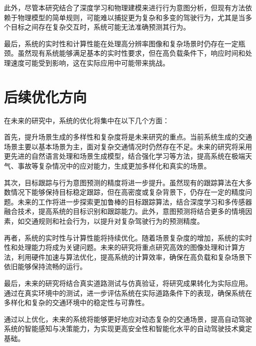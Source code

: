 此外，尽管本研究结合了深度学习和物理建模来进行行为意图分析，但现有方法依赖于物理模型的简单规则，可能难以捕捉更为复杂和多变的驾驶行为，尤其是当多个目标之间存在复杂交互时，系统可能无法准确预测其行为。

最后，系统的实时性和计算性能在处理高分辨率图像和复杂场景时仍存在一定瓶颈。虽然现有系统能够满足基本的实时性要求，但在高负载条件下，响应时间和处理速度可能受到影响，这在实际应用中可能带来挑战。

\section{后续优化方向}

在未来的研究中，系统的优化将集中在以下几个方面：

首先，提升场景生成的多样性和复杂度将是未来研究的重点。当前系统生成的交通场景主要以基本场景为主，面对复杂交通情况时仍然存在不足。未来的研究将采用更先进的自然语言处理和场景生成模型，结合强化学习等方法，提高系统在极端天气、事故等复杂情况中的应对能力，生成更加多样化和真实的场景。

其次，目标跟踪与行为意图预测的精度将进一步提升。虽然现有的跟踪算法在大多数情况下能够保持目标稳定跟踪，但在高密度或复杂背景下，仍存在一定的精度问题。未来的工作将进一步探索更加鲁棒的目标跟踪算法，结合深度学习和多传感器融合技术，提高系统的目标识别和跟踪能力。此外，意图预测将结合更多的情境因素，如交通规则和社会行为，以提升对复杂驾驶行为的预测精度。

再者，系统的实时性与计算性能将持续优化。随着场景复杂度的增加，系统的实时性和处理能力将成为关键问题。未来的研究将重点研究高效的图像处理和计算方法，利用硬件加速与算法优化，提高系统的计算效率，确保在高负载和复杂场景下依旧能够保持流畅的运行。

最后，未来的研究将结合真实道路测试与仿真验证，将研究成果转化为实际应用。通过在真实环境中的测试，进一步评估系统在实际道路条件下的表现，确保系统在多样化和复杂的交通环境中的稳定性与可靠性。

通过以上优化，未来的系统将能够更好地应对动态复杂的交通场景，提高自动驾驶系统的智能感知与决策能力，为实现更高安全性和智能化水平的自动驾驶技术奠定基础。
